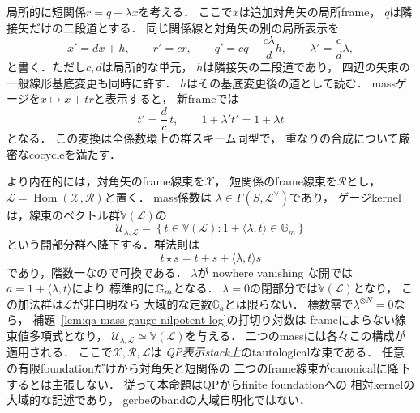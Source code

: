\begin{proposition}[massゲージ群の全frame変更と線束値降下]
\label{prop:qa-mass-gauge-line-bundle-descent}
局所的に短関係$r=q+\lambda x$を考える．
ここで$x$は追加対角矢の局所frame，
$q$は隣接矢だけの二段道とする．
同じ関係線と対角矢の別の局所表示を
\[
 x'=d x+h,\qquad r'=c r,\qquad
 q'=c q-\frac{c\lambda}{d}h,\qquad
 \lambda'=\frac{c}{d}\lambda ,
 \tag{RF}\label{eq:qa-mass-reframing}
\]
と書く．ただし$c,d$は局所的な単元，
$h$は隣接矢の二段道であり，
四辺の矢束の一般線形基底変更も同時に許す．
$h$はその基底変更後の道として読む．
massゲージを$x\mapsto x+t r$と表示すると，
新frameでは
\[
 t'=\frac dc\,t,\qquad
 1+\lambda't'=1+\lambda t
 \tag{MT}\label{eq:qa-mass-gauge-reframing}
\]
となる．
この変換は全係数環上の群スキーム同型で，
重なりの合成について厳密なcocycleを満たす．

より内在的には，対角矢のframe線束を$\mathscr X$，
短関係のframe線束を$\mathscr R$とし，
$\mathscr L=\operatorname{Hom}(\mathscr X,\mathscr R)$と置く．
mass係数は
$\lambda\in\Gamma(S,\mathscr L^\vee)$であり，
ゲージkernelは，線束のベクトル群$\mathbb V(\mathscr L)$の
\[
 \mathcal U_{\lambda,\mathscr L}
 =\left\{t\in\mathbb V(\mathscr L):
       1+\langle\lambda,t\rangle\in\mathbb G_m\right\}
 \tag{UL}\label{eq:qa-mass-gauge-intrinsic-line-group}
\]
という開部分群へ降下する．群法則は
\[
 t\star s=t+s+\langle\lambda,t\rangle s
\]
であり，階数一なので可換である．
$\lambda$が nowhere vanishing な開では
$a=1+\langle\lambda,t\rangle$により
標準的に$\mathbb G_m$となる．
$\lambda=0$の閉部分では$\mathbb V(\mathscr L)$となり，
この加法群は$\mathscr L$が非自明なら
大域的な定数$\mathbb G_a$とは限らない．
標数零で$\lambda^{\otimes N}=0$なら，
補題~\ref{lem:qa-mass-gauge-nilpotent-log}の打切り対数は
frameによらない線束値多項式となり，
$\mathcal U_{\lambda,\mathscr L}
 \simeq\mathbb V(\mathscr L)$を与える．
二つのmassには各々この構成が適用される．
ここで$\mathscr X,\mathscr R,\mathscr L$は
\emph{QP表示stack上}のtautologicalな束である．
任意の有限foundationだけから対角矢と短関係の
二つのframe線束がcanonicalに降下するとは主張しない．
従って本命題はQPからfinite foundationへの
相対kernelの大域的な記述であり，
gerbeのbandの大域自明化ではない．
\end{proposition}
